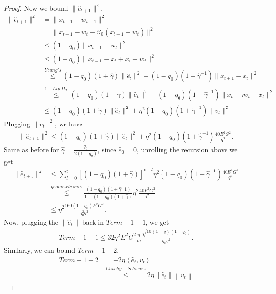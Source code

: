 \documentclass{article} %
\newcommand\norm[1]{\left\lVert#1\right\rVert}
\def\C{{\mathcal C}}
\newcommand{\inner}[2]{\left\langle #1, #2 \right\rangle}
\begin{document}
\begin{proof}
    Now we bound $\|\hat{e}_{t+1}\|^2$.
    \begin{equation*}
        \begin{aligned}
        \|\hat{e}_{t+1}\|^2 &= \|x_{t+1} - w_{t+1}\|^2
        \\
        & = \|x_{t+1} -w_t - \C_0(x_{t+1}-w_t)\|^2
        \\
        & \leq (1-q_0) \|x_{t+1} -w_t\|^2\
        \\
        & \leq (1-q_0) \|x_{t+1} - x_t + x_t - w_t\|^2
        \\
        &\overset{Young's}{\leq}(1-q_0)(1+\hat{\gamma})\|\hat{e}_t\|^2 + (1-q_0)(1+\hat{\gamma}^{-1}) \|x_{t+1} - x_t\|^2
        \\
        &\overset{1-Lip\ \Pi_\mathcal{X}}{\leq} (1-q_0)(1+\hat{\gamma})\|\hat{e}_t\|^2 + (1-q_0)(1+\hat{\gamma}^{-1}) \|x_t - \eta v_t - x_t \|^2
        \\
        &\leq(1-q_0)(1+\hat{\gamma})\|\hat{e}_t\|^2 + \eta^2(1-q_0)(1+\hat{\gamma}^{-1})\|v_t\|^2
        \end{aligned}
    \end{equation*}
    Plugging $\|v_t\|^2$, we have 
    \begin{align*}
    \|\hat{e}_{t+1}\|^2 \leq (1-q_0)(1+\hat{\gamma})\|\hat{e}_t\|^2 + \eta^2(1-q_0)(1+\hat{\gamma}^{-1})\frac{40 E^2G^2}{ q^2}.
    \end{align*}
    Same as before for $\hat{\gamma} =\frac{q_0}{2(1-q_0)} $, since $\hat{e}_0 = 0$, unrolling the recursion above we get
    \begin{align*}
        \|\hat{e}_{t+1}\|^2 &\leq \sum_{l=0}^{t}\left[(1-q_0)(1+\hat{\gamma})\right]^{t-l}\eta^2(1-q_0)(1+\hat{\gamma}^{-1})\frac{40 E^2G^2}{ q^2}
        \\
        &\overset{geometric\ sum}{\leq}\frac{(1-q_0)(1+\hat{\gamma}^-1)}{1- (1-q_0)(1+\hat{\gamma})}\eta^2\frac{40 E^2G^2}{ q^2}
        \\
        & \leq \eta^2 \frac{160(1-q_0) E^2G^2}{ q_0^2q^2}.
    \end{align*}
    Now, plugging the $\|\hat{e}_t\|$ back in $Term-1-1$, we get
    \begin{align*}
        Term-1-1 \leq 32\eta^2 E^2G^2\frac{n}{m} \frac{\sqrt{10(1-q) (1-q_0)}}{q_0q^2}.
    \end{align*}
    Similarly, we can bound $Term-1-2$.
    \begin{align*}
        Term-1-2 &= - 2\eta \inner{\hat{e}_t}{v_t}
        \\
        & \overset{Cauchy-Schwarz}{\leq}2\eta\norm{\hat{e}_t}\norm{v_t}

\end{align*}
\end{proof}
\end{document}
